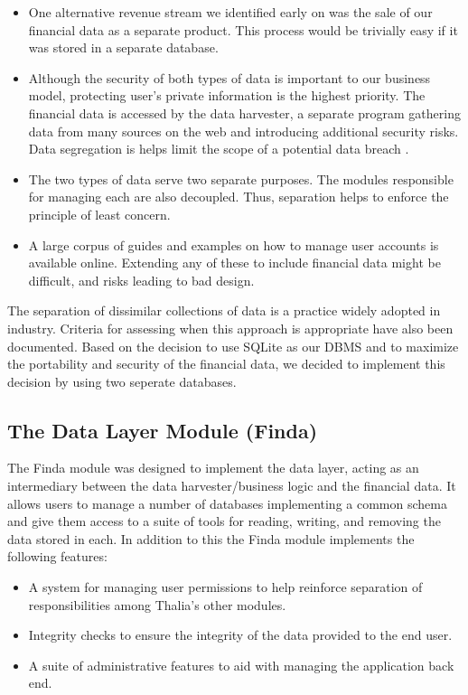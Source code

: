 \documentclass[main.tex]{subfiles}
\begin{document}
\begin{itemize}

\item One alternative revenue stream we identified early on was the sale of our financial data as a separate product. This process would be trivially easy if it was stored in a separate database. 
\item Although the security of both types of data is important to our business model, protecting user’s private information is the highest priority. The financial data is accessed by the data harvester, a separate program gathering data from many sources on the web and introducing additional security risks. Data segregation is helps limit the scope of a potential data breach \cite{ciscoSeg}.
\item The two types of data serve two separate purposes. The modules responsible for managing each are also decoupled. Thus, separation helps to enforce the principle of least concern.
\item A large corpus of guides and examples on how to manage user accounts is available online. Extending any of these to include financial data might be difficult, and risks leading to bad design.

\end{itemize}

The separation of dissimilar collections of data is a practice widely adopted in industry. Criteria for assessing when this approach is appropriate have also been documented. \cite{dataSegImp} Based on the decision to use SQLite as our DBMS and to maximize the portability and security of the financial data, we decided to implement this decision by using two seperate databases.

\subsection{The Data Layer Module (Finda)}

The Finda module was designed to implement the data layer, acting as an intermediary between the data harvester/business logic and the financial data. It allows users to manage a number of databases implementing a common schema and give them access to a suite of tools for reading, writing, and removing the data stored in each. In addition to this the Finda module implements the following features:

\begin{itemize}
\item A system for managing user permissions to help reinforce separation of responsibilities among Thalia's other modules. 
\item Integrity checks to ensure the integrity of the data provided to the end user.
\item A suite of administrative features to aid with managing the application back end.
\end{itemize}
\end{document}
